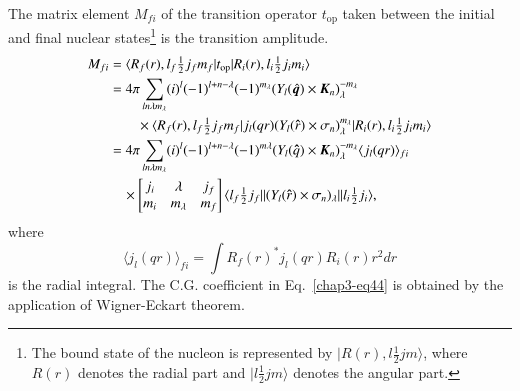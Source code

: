 The matrix element $M_{fi}$ of the transition operator $t_{\text{op}}$ taken between the initial and final nuclear states\footnote{The bound state of the nucleon is represented by $|R(r), l \tfrac{1}{2} jm \rangle$, where $R(r)$ denotes the radial part and $|l\tfrac{1}{2} jm \rangle$ denotes the angular part.} is the transition amplitude.
\begin{align}
  M_{fi} & = \langle R_f (r), l_f \tfrac{1}{2} j_f m_f| t_{\text{op}}| R_i (r) , l_i \tfrac{1}{2} j_i m_i \rangle \notag \\
  & = 4 \pi \sum_{ln\lambda m_\lambda} (i)^l (-1)^{l + n -\lambda} (-1)^{m_\lambda} (Y_l ({{\hat{\boldsymbol q}}}) \times {\boldsymbol K}_n)_{\lambda}^{-m_\lambda} \notag \\
  & \qquad \times \langle R_f (r), l_f \tfrac{1}{2} j_f m_f | j_l (qr) (Y_l ({\boldsymbol \hat{r}}) \times \sigma_n)_\lambda^{m_\lambda} |R_i (r), l_i \tfrac{1}{2} j_i m_i \rangle \notag \\
  & = 4\pi \sum_{ln \lambda m_\lambda} (i)^l (-1)^{l + n -\lambda} (-1)^{m \lambda} (Y_l({\boldsymbol \hat{q}})\times {\boldsymbol K}_n)^{-m_\lambda}_\lambda \langle j_l (qr)\rangle_{fi}\notag \\
  &\quad\times \begin{bmatrix} j_i & \lambda & j_f \\ m_i & m_\lambda & m_f \end{bmatrix}
  \langle l_f \tfrac{1}{2} j_f || (Y_l ({\boldsymbol \hat{r}}) \times \sigma_n)_\lambda|| l_i \tfrac{1}{2} j_i \rangle, \label{chap3-eq44}
\end{align}
where
$$
\langle j_l (qr)\rangle_{fi} = \int R_f (r)^\ast j_l(qr) R_i (r) r^2 dr
$$
is the radial integral. The C.G. coefficient in Eq.\ \eqref{chap3-eq44} is obtained by the application of Wigner-Eckart theorem.

